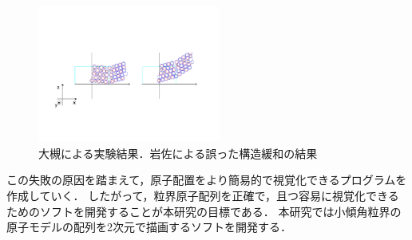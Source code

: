 \begin{figure}[htbp]\begin{center}
\includegraphics[width=6cm,bb=0 0 442 500]{../figs/./boundary_narita.004.jpg}
\caption{大槻による実験結果．岩佐による誤った構造緩和の結果}
\label{default}\end{center}\end{figure}
この失敗の原因を踏まえて，原子配置をより簡易的で視覚化できるプログラムを作成していく．
したがって，粒界原子配列を正確で，且つ容易に視覚化できるためのソフトを開発することが本研究の目標である．
本研究では小傾角粒界の原子モデルの配列を2次元で描画するソフトを開発する．

